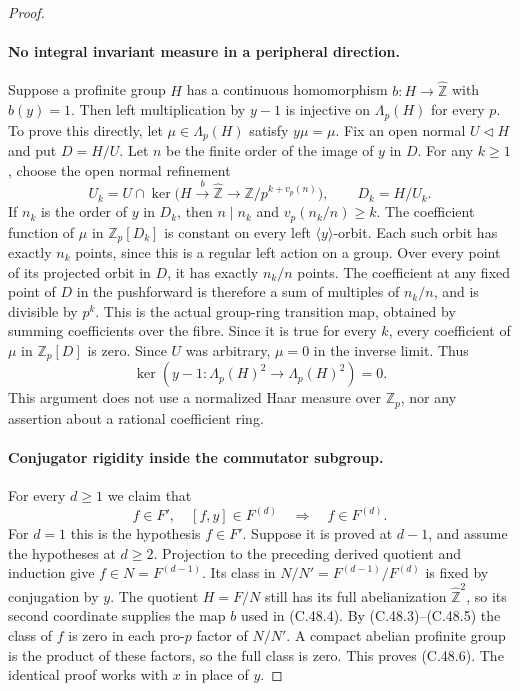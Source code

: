 \begin{proof}
\paragraph{No integral invariant measure in a peripheral direction.}
Suppose a profinite group $H$ has a continuous homomorphism
$b:H\to\widehat{\mathbb Z}$ with $b(y)=1$.
Then left multiplication by $y-1$ is injective on
$\Lambda_p(H)$ for every $p$.
To prove this directly, let $\mu\in\Lambda_p(H)$ satisfy
$y\mu=\mu$. Fix an open normal $U\triangleleft H$ and put
$D=H/U$. Let $n$ be the finite order of the image of $y$ in $D$.
For any $k\geq1$, choose the open normal refinement
\[
 U_k=U\cap\ker\bigl(H\xrightarrow{b}\widehat{\mathbb Z}
                   \longrightarrow\mathbb Z/p^{k+v_p(n)}\bigr),
 \qquad D_k=H/U_k.                                    \tag{C.48.4}
\]
If $n_k$ is the order of $y$ in $D_k$, then $n\mid n_k$
and $v_p(n_k/n)\geq k$.
The coefficient function of $\mu$ in $\mathbb Z_p[D_k]$ is
constant on every left $\langle y\rangle$-orbit.
Each such orbit has exactly $n_k$ points, since this is a regular
left action on a group. Over every point of its projected orbit
in $D$, it has exactly $n_k/n$ points.
The coefficient at any fixed point of $D$ in the pushforward is
therefore a sum of multiples of $n_k/n$, and is divisible by $p^k$.
This is the actual group-ring transition map, obtained by summing
coefficients over the fibre. Since it is true for every $k$, every
coefficient of $\mu$ in $\mathbb Z_p[D]$ is zero.
Since $U$ was arbitrary, $\mu=0$ in the inverse limit. Thus
\[
        \ker(y-1:\Lambda_p(H)^2\to\Lambda_p(H)^2)=0.   \tag{C.48.5}
\]
This argument does not use a normalized Haar measure over
$\mathbb Z_p$, nor any assertion about a rational coefficient ring.

\paragraph{Conjugator rigidity inside the commutator subgroup.}
For every $d\geq1$ we claim that
\[
 f\in F',\quad [f,y]\in F^{(d)}
                  \quad\Longrightarrow\quad f\in F^{(d)}.
                                                               \tag{C.48.6}
\]
For $d=1$ this is the hypothesis $f\in F'$.
Suppose it is proved at $d-1$, and assume the hypotheses at $d\geq2$.
Projection to the preceding derived quotient and induction give
$f\in N=F^{(d-1)}$. Its class in $N/N'=F^{(d-1)}/F^{(d)}$
is fixed by conjugation by $y$. The quotient $H=F/N$ still has
its full abelianization $\widehat{\mathbb Z}^2$, so its second
coordinate supplies the map $b$ used in (C.48.4).
By (C.48.3)--(C.48.5) the class of $f$ is zero in each pro-$p$
factor of $N/N'$. A compact abelian profinite group is the product
of these factors, so the full class is zero. This proves (C.48.6).
The identical proof works with $x$ in place of $y$.


\end{proof}
